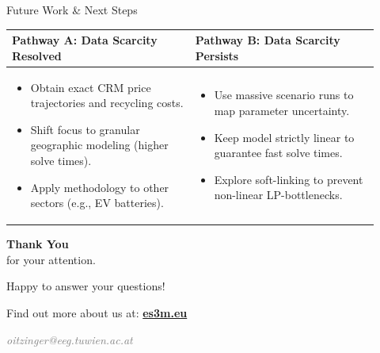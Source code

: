 \documentclass[10pt]{beamer}
\begin{document}
\begin{frame}{Future Work \& Next Steps}
    \begin{table}
        \centering
        \begin{tabular}{p{0.46\linewidth} | p{0.46\linewidth}}
            \textcolor{metublue}{\textbf{Pathway A: Data Scarcity Resolved}} & \textcolor{metublue}{\textbf{Pathway B: Data Scarcity Persists}} \\
            \midrule
            \vspace{-0.4cm}
            \begin{itemize}
                \item Obtain exact CRM price trajectories and recycling costs.
                \item Shift focus to granular geographic modeling (higher solve times).
                \item Apply methodology to other sectors (e.g., EV batteries).
            \end{itemize}
            & 
            \vspace{-0.4cm}
            \begin{itemize}
                \item Use massive scenario runs to map parameter uncertainty.
                \item Keep model strictly linear to guarantee fast solve times.
                \item Explore soft-linking to prevent non-linear LP-bottlenecks.
            \end{itemize} \\
        \end{tabular}
    \end{table}
\end{frame}

\begin{frame}[plain] 
    \centering
    \vspace*{1.5cm}


    {\Huge \textcolor{metublue}{\textbf{Thank You}}} \\[0.5cm]
    {\Large for your attention.}

    \vspace{1.5cm}

    {\Large Happy to answer your questions!}

    \vspace{0.8cm}

    {\large Find out more about us at: \href{https://es3m.eu}{\textbf{\textcolor{metublue}{es3m.eu}}}}

    \vspace{0.5cm}

    \vfill

    {\footnotesize \textit{\textcolor{gray}{oitzinger@eeg.tuwien.ac.at}}}
    \vspace*{0.5cm}
\end{frame}
\end{document}
